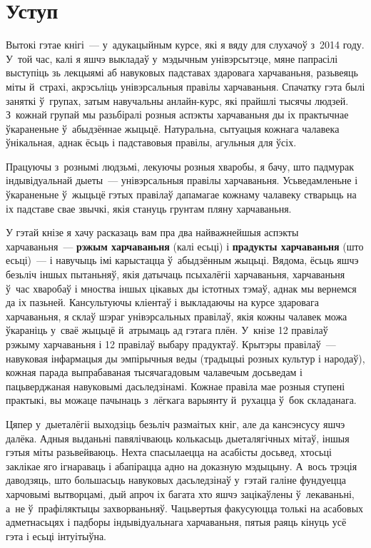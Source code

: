 \chapter*[Уступ]{Уступ}

Вытокі гэтае кнігі~--- у~адукацыйным курсе, які я вяду для слухачоў з~2014 году. У~той час, калі я яшчэ выкладаў у~мэдычным унівэрсытэце, мяне папрасілі выступіць зь лекцыямі аб навуковых падставах здаровага харчаваньня, разьвеяць міты й~страхі, акрэсьліць унівэрсальныя правілы харчаваньня. Спачатку гэта былі заняткі ў~групах, затым навучальны анлайн-курс, які прайшлі тысячы людзей. З~кожнай групай мы разьбіралі розныя аспэкты харчаваньня ды іх практычнае ўкараненьне ў~абыдзённае жыцьцё. Натуральна, сытуацыя кожнага чалавека ўнікальная, аднак ёсьць і падставовыя правілы, агульныя для ўсіх.

Працуючы з~рознымі людзьмі, лекуючы розныя хваробы, я бачу, што падмурак індывідуальнай дыеты~--- унівэрсальныя правілы харчаваньня. Усьведамленьне і ўкараненьне ў~жыцьцё гэтых правілаў дапамагае кожнаму чалавеку стварыць на іх падставе свае звычкі, якія стануць грунтам пляну харчаваньня.

У гэтай кнізе я хачу расказаць вам пра два найважнейшыя аспэкты харчаваньня~--- \textbf{рэжым харчаваньня} (калі есьці) і \textbf{прадукты харчаваньня} (што есьці)~--- і навучыць імі карыстацца ў~абыдзённым жыцьці. Вядома, ёсьць яшчэ безьліч іншых пытаньняў, якія датычаць псыхалёгіі харчаваньня, харчаваньня ў~час хваробаў і мноства іншых цікавых ды істотных тэмаў, аднак мы вернемся да іх пазьней. Кансультуючы кліентаў і выкладаючы на курсе здаровага харчаваньня, я склаў шэраг унівэрсальных правілаў, якія кожны чалавек можа ўкараніць у~сваё жыцьцё й~атрымаць ад гэтага плён. У~кнізе 12 правілаў рэжыму харчаваньня і 12 правілаў выбару прадуктаў. Крытэры правілаў~--- навуковая інфармацыя ды эмпірычныя веды (традыцыі розных культур і народаў), кожная парада выпрабаваная тысячагадовым чалавечым досьведам і пацьверджаная навуковымі дасьледзінамі. Кожнае правіла мае розныя ступені практыкі, вы можаце пачынаць з~лёгкага варыянту й~рухацца ў~бок складанага.

Цяпер у~дыеталёгіі выходзіць безьліч размаітых кніг, але да кансэнсусу яшчэ далёка. Адныя выданьні павялічваюць колькасьць дыеталягічных мітаў, іншыя гэтыя міты разьвейваюць. Нехта спасылаецца на асабісты досьвед, хтосьці заклікае яго ігнараваць і абапірацца адно на доказную мэдыцыну. А~вось трэція даводзяць, што большасьць навуковых дасьледзінаў у~гэтай галіне фундуецца харчовымі вытворцамі, дый апроч іх багата хто яшчэ зацікаўлены ў~лекаваньні, а~не ў~прафіляктыцы захворваньняў. Чацьвертыя факусуюцца толькі на асабовых адметнасьцях і падборы індывідуальнага харчаваньня, пятыя раяць кінуць усё гэта і есьці інтуітыўна.


